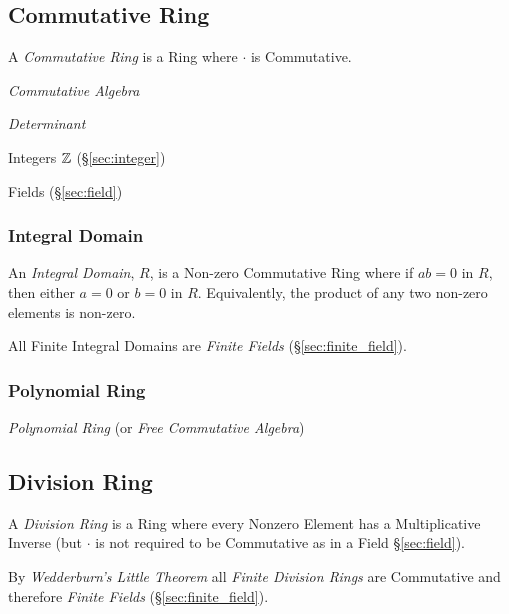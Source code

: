 \subsection{Commutative Ring}\label{sec:commutative_ring}

A \emph{Commutative Ring} is a Ring where $\cdot$ is Commutative.

\emph{Commutative Algebra}

\emph{Determinant}

Integers $\mathbb{Z}$ (\S\ref{sec:integer})

Fields (\S\ref{sec:field})



\subsubsection{Integral Domain}\label{sec:integral_domain}

An \emph{Integral Domain}, $R$, is a Non-zero Commutative Ring where
if $ab = 0$ in $R$, then either $a = 0$ or $b = 0$ in $R$.
Equivalently, the product of any two non-zero elements is non-zero.

All Finite Integral Domains are \emph{Finite Fields}
(\S\ref{sec:finite_field}).



\subsubsection{Polynomial Ring}\label{sec:polynomial_ring}

\emph{Polynomial Ring} (or \emph{Free Commutative Algebra})



\subsection{Division Ring}\label{sec:division_ring}

A \emph{Division Ring} is a Ring where every Nonzero Element has a
Multiplicative Inverse (but $\cdot$ is not required to be Commutative
as in a Field \S\ref{sec:field}).


By \emph{Wedderburn's Little Theorem} all \emph{Finite Division Rings}
are Commutative and therefore \emph{Finite Fields}
(\S\ref{sec:finite_field}).



